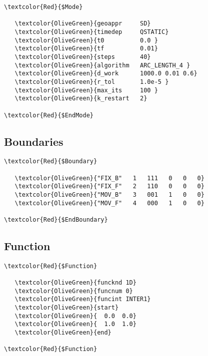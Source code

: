 \begin{Verbatim}[frame=single,commandchars=\\\{\},samepage=true]
\textcolor{Red}{$Mode}

   \textcolor{OliveGreen}{geoappr     SD}  
   \textcolor{OliveGreen}{timedep     QSTATIC}
   \textcolor{OliveGreen}{t0          0.0 }
   \textcolor{OliveGreen}{tf          0.01} 
   \textcolor{OliveGreen}{steps       40} 
   \textcolor{OliveGreen}{algorithm   ARC_LENGTH_4 }
   \textcolor{OliveGreen}{d_work      1000.0 0.01 0.6}
   \textcolor{OliveGreen}{r_tol       1.0e-5 }
   \textcolor{OliveGreen}{max_its     100 }
   \textcolor{OliveGreen}{k_restart   2} 

\textcolor{Red}{$EndMode}
\end{Verbatim}

\subsection{Boundaries}

\begin{Verbatim}[frame=single,commandchars=\\\{\}]
\textcolor{Red}{$Boundary}

   \textcolor{OliveGreen}{"FIX_B"   1   111   0   0   0} 
   \textcolor{OliveGreen}{"FIX_F"   2   110   0   0   0} 
   \textcolor{OliveGreen}{"MOV_B"   3   001   1   0   0} 
   \textcolor{OliveGreen}{"MOV_F"   4   000   1   0   0} 
   
\textcolor{Red}{$EndBoundary}
\end{Verbatim}

\subsection{Function}

\begin{Verbatim}[frame=single,commandchars=\\\{\}]
\textcolor{Red}{$Function}

   \textcolor{OliveGreen}{funcknd 1D} 
   \textcolor{OliveGreen}{funcnum 0} 
   \textcolor{OliveGreen}{funcint INTER1} 
   \textcolor{OliveGreen}{start} 
   \textcolor{OliveGreen}{  0.0  0.0} 
   \textcolor{OliveGreen}{  1.0  1.0} 
   \textcolor{OliveGreen}{end} 
   
\textcolor{Red}{$Function}
\end{Verbatim}

